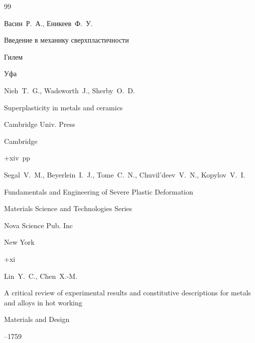 \begin{thebibliography}{99}

\by Васин~Р.~А., Еникеев~Ф.~У.

\book Введение в механику сверхпластичности


\publ Гилем

\publaddr Уфа







\by Nieh~T.~G., Wadsworth~J., Sherby~O.~D.

\book Superplasticity in metals and ceramics


\publ Cambridge Univ. Press

\publaddr Cambridge

+xiv~pp \nofrills







\by Segal~V.~M., Beyerlein~I.~J., Tome~C.~N., Chuvil'deev~V.~N., Kopylov~V.~I.

\book Fundamentals and Engineering of Severe Plastic Deformation


\serial Materials Science and Technologies Series

\publ Nova Science Pub. Inc

\publaddr New York

+xi






\by Lin~Y.~C., Chen~X.-M.

\paper A critical review of experimental results and constitutive descriptions for metals and alloys in hot working

\jour Materials and Design




--1759








\end{thebibliography}
